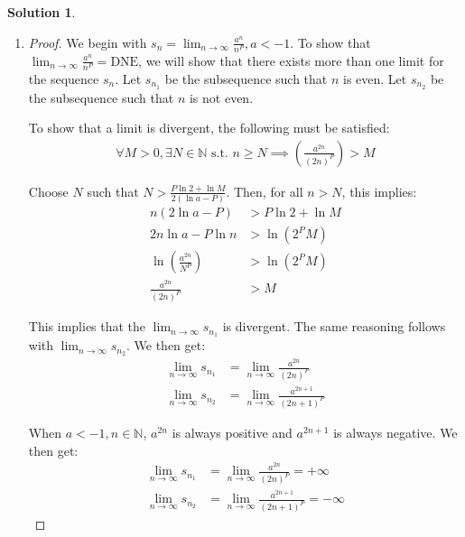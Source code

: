\documentclass[12pt]{article}
\theoremstyle{definition} %
\newtheorem{solution}{Solution}
\theoremstyle{plain} %
\begin{document}
\begin{solution}
\begin{enumerate}
\begin{proof}
        The $\lim_{n \to \infty} \left| \frac{s_{n+1}}{s_n} \right|$ exists, so Problem 1 applies. According to the result from Problem 1a, if $\lim_{n \to \infty} \left| \frac{s_{n+1}}{s_n} \right| > 1$, then $\lim_{n \to \infty} s_n = +\infty$. When $a > 1$, $\lim_{n \to \infty} \frac{a^n}{n^P} = a$. Therefore, its limit must be $+\infty$ when $a > 1$, as desired. 
    \end{proof}
    \item \begin{proof}
        We begin with $s_n = \lim_{n \to \infty} \frac{a^n}{n^P}, a < -1$. To show that $\lim_{n \to \infty} \frac{a^n}{n^P} = \text{DNE}$, we will show that there exists more than one limit for the sequence $s_n$. Let $s_{n_1}$ be the subsequence such that $n$ is even. Let $s_{n_2}$ be the subsequence such that $n$ is not even. 
    
        To show that a limit is divergent, the following must be satisfied: 
        \begin{align}
        \forall M > 0, \exists N \in \mathbb{N} \text{ s.t. } n \geq N \implies \left( \frac{a^{2n}}{(2n)^P} \right) > M \tag{23}
        \end{align}
    
        Choose $N$ such that $N > \frac{P \ln 2 + \ln M}{2 (\ln a - P)}$. Then, for all $n > N$, this implies:
        \begin{align}
            n(2 \ln a - P) &> P \ln 2 + \ln M \tag{24} \\
            2n \ln a - P \ln n &> \ln (2^P M) \tag{25} \\
            \ln \left( \frac{a^{2n}}{N^P} \right) &> \ln (2^P M) \tag{26} \\
            \frac{a^{2n}}{(2n)^P} &> M \tag{27}
        \end{align}
    
        This implies that the $\lim_{n \to \infty} s_{n_1}$ is divergent. The same reasoning follows with $\lim_{n \to \infty} s_{n_2}$. We then get:
        \begin{align}
            \lim_{n \to \infty} s_{n_1} &= \lim_{n \to \infty} \frac{a^{2n}}{(2n)^P} \tag{28} \\
            \lim_{n \to \infty} s_{n_2} &= \lim_{n \to \infty} \frac{a^{2n+1}}{(2n+1)^P} \tag{29}
        \end{align}
    
        When $a < -1, n \in \mathbb{N}$, $a^{2n}$ is always positive and $a^{2n+1}$ is always negative. We then get:
        \begin{align}
            \lim_{n \to \infty} s_{n_1} &= \lim_{n \to \infty} \frac{a^{2n}}{(2n)^P} = +\infty \tag{31} \\
            \lim_{n \to \infty} s_{n_2} &= \lim_{n \to \infty} \frac{a^{2n+1}}{(2n+1)^P} = -\infty \tag{32}
        \end{align}
    

\end{proof}
\end{enumerate}
\end{solution}
\end{document}
